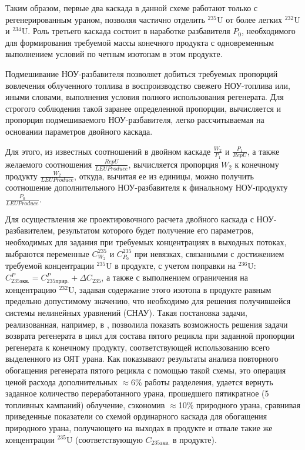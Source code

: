 Таким образом, первые два каскада в данной схеме работают только с регенерированным ураном, позволяя частично отделить $^{235}$U от более легких $^{232}$U и $^{234}$U. Роль третьего каскада состоит в наработке разбавителя $P_{0}$, необходимого для формирования требуемой массы конечного продукта с одновременным выполнением условий по четным изотопам в этом продукте.

Подмешивание НОУ-разбавителя позволяет добиться требуемых пропорций вовлечения облученного топлива в воспроизводство свежего НОУ-топлива или, иными словами, выполнения условия полного использования регенерата. Для строгого соблюдения такой заранее определенной пропорции, вычисляется и пропорция подмешиваемого НОУ-разбавителя, легко рассчитываемая на основании параметров двойного каскада.

Для этого, из известных соотношений в двойном каскаде $\frac{W_{2}}{P_{1}}$ и $\frac{P_{1}}{RepU}$, а также желаемого соотношения $\frac{RepU}{LEU Produce}$, вычисляется пропорция $W_2$ к конечному продукту $\frac{W_{2}}{LEU Produce}$, откуда, вычитая ее из единицы, можно получить соотношение дополнительного НОУ-разбавителя 
к финальному НОУ-продукту $\frac{P_{0}}{LEU Produce}$.

Для осуществления же проектировочного расчета двойного каскада с НОУ-разбавителем, результатом которого будет получение его параметров, необходимых для задания при требуемых концентрациях в выходных потоках, выбраются переменные $C_{W_2}^{235}$ и $C_{P_0}^{235}$ при невязках, связанными с достижением требуемой концентрации $^{235}$U в продукте, с учетом поправки на $^{236}$U: $C_{235 экв.}^{P}=C_{235 прир.}^{P}+\Delta C_{235}$,  а также с выполнением ограничения на концентрацию $^{232}$U, задавая содержание этого изотопа в продукте равным предельно допустимому значению, что необходимо для решения получившейся системы нелинейных уравнений (СНАУ). Такая постановка задачи, реализованная, например, в \cite{gusevMultycascadeEnrichmentSchemes2020}, позволила показать возможность решения задачи возврата регенерата в цикл для состава пятого рецикла при заданной пропорции регенерата к конечному продукту, соответствующей использованию всего выделенного из ОЯТ урана. Как показывают результаты анализа повторного обогащения регенерата пятого рецикла с помощью такой схемы, это операция ценой расхода дополнительных $\approx$6\% работы разделения, удается вернуть заданное количество переработанного урана, прошедшего пятикратное (5 топливных кампаний) облучение, сэкономив $\approx$10\% природного урана, сравнивая приведенные показатели со схемой ординарного каскада для обогащения природного урана, получающего на выходах в продукте и отвале такие же концентрации $^{235}$U (соответствующую $C_{235 экв.}$ в продукте).

